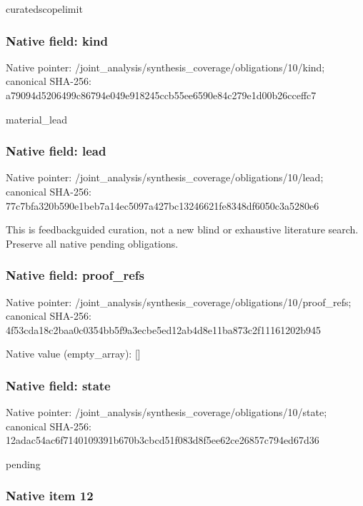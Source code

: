 \documentclass[10pt,a4paper]{article}
\begin{document}
curatedscopelimit


\subsubsection{Native field: kind}


Native pointer: /joint\_analysis/synthesi\allowbreak{}s\_coverage/obligations/1\allowbreak{}0/kind; canonical SHA-256: a79094d5206499c86794e049\allowbreak{}e918245ccb55ee6590e84c27\allowbreak{}9e1d00b26cceffc7


material\_lead


\subsubsection{Native field: lead}


Native pointer: /joint\_analysis/synthesi\allowbreak{}s\_coverage/obligations/1\allowbreak{}0/lead; canonical SHA-256: 77c7bfa320b590e1beb7a14e\allowbreak{}c5097a427bc13246621fe834\allowbreak{}8df6050c3a5280e6


This is feedbackguided curation, not a new blind or exhaustive literature search. Preserve all native pending obligations.


\subsubsection{Native field: proof\_refs}


Native pointer: /joint\_analysis/synthesi\allowbreak{}s\_coverage/obligations/1\allowbreak{}0/proof\_refs; canonical SHA-256: 4f53cda18c2baa0c0354bb5f\allowbreak{}9a3ecbe5ed12ab4d8e11ba87\allowbreak{}3c2f11161202b945



Native value (empty\_array): []



\subsubsection{Native field: state}


Native pointer: /joint\_analysis/synthesi\allowbreak{}s\_coverage/obligations/1\allowbreak{}0/state; canonical SHA-256: 12adac54ac6f7140109391b6\allowbreak{}70b3cbcd51f083d8f5ee62ce\allowbreak{}26857c794ed67d36


pending


\subsubsection{Native item 12}
\end{document}
